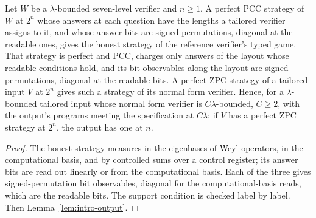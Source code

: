 \begin{lemma}
\label{lem:intro-honest-zpc}
\leanok
Let $W$ be a $\lambda$-bounded seven-level verifier and $n \geq 1$. A perfect PCC strategy of
$W$ at $2^n$ whose answers at each question have the lengths a tailored verifier assigns to it,
and whose answer bits are signed permutations, diagonal at the readable ones, gives the honest
strategy of the reference verifier's typed game. That strategy is perfect and PCC, charges only
answers of the layout whose readable conditions hold, and its bit observables along the layout
are signed permutations, diagonal at the readable bits. A perfect ZPC strategy of a tailored
input $V$ at $2^n$ gives such a strategy of its normal form verifier. Hence, for a
$\lambda$-bounded tailored input whose normal form verifier is $C\lambda$-bounded, $C \geq 2$,
with the output's programs meeting the specification at $C\lambda$: if $V$ has a perfect
ZPC strategy at $2^n$, the output has one at $n$.
\end{lemma}

\begin{proof}
\leanok
The honest strategy measures in the eigenbases of Weyl operators, in the computational basis,
and by controlled sums over a control register; its answer bits are read out linearly or from
the computational basis. Each of the three gives signed-permutation bit observables, diagonal for
the computational-basis reads, which are the readable bits. The support condition is checked
label by label. Then Lemma~\ref{lem:intro-output}.
\end{proof}

